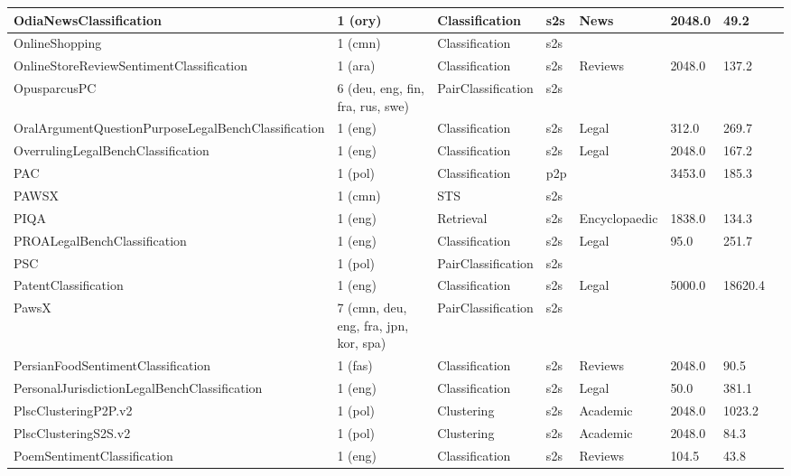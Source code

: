 \begin{longtable}{L{5.0cm}|L{1.5cm}L{1.4cm}L{1.4cm}L{1.4cm}L{1.4cm}L{1.0cm}L{1.0cm}}
 \hline 
OdiaNewsClassification \cite{kunchukuttan2020indicnlpcorpus} & 1 (ory) & Classification & s2s & News & 2048.0 & 49.2 \\
 \hline 
OnlineShopping \cite{nielsen-2023-scandeval} & 1 (cmn) & Classification & s2s &  &  &  \\
 \hline 
OnlineStoreReviewSentimentClassification  & 1 (ara) & Classification & s2s & Reviews & 2048.0 & 137.2 \\
 \hline 
OpusparcusPC \cite{creutz2018open} & 6 (deu, eng, fin, fra, rus, swe) & PairClassification & s2s &  &  &  \\
 \hline 
OralArgumentQuestionPurposeLegalBenchClassification \cite{guha2023legalbench} & 1 (eng) & Classification & s2s & Legal & 312.0 & 269.7 \\
 \hline 
OverrulingLegalBenchClassification \cite{guha2023legalbench} & 1 (eng) & Classification & s2s & Legal & 2048.0 & 167.2 \\
 \hline 
PAC  & 1 (pol) & Classification & p2p &  & 3453.0 & 185.3 \\
 \hline 
PAWSX \cite{raghu-etal-2021-end} & 1 (cmn) & STS & s2s &  &  &  \\
 \hline 
PIQA \cite{xiao2024rar} & 1 (eng) & Retrieval & s2s & Encyclopaedic & 1838.0 & 134.3 \\
 \hline 
PROALegalBenchClassification \cite{guha2023legalbench} & 1 (eng) & Classification & s2s & Legal & 95.0 & 251.7 \\
 \hline 
PSC \cite{ogrodniczuk-kopec-2014-polish} & 1 (pol) & PairClassification & s2s &  &  &  \\
 \hline 
PatentClassification \cite{sharma-etal-2019-bigpatent} & 1 (eng) & Classification & s2s & Legal & 5000.0 & 18620.4 \\
 \hline 
PawsX \cite{yang2019pawsx} & 7 (cmn, deu, eng, fra, jpn, kor, spa) & PairClassification & s2s &  &  &  \\
 \hline 
PersianFoodSentimentClassification \cite{ParsBERT} & 1 (fas) & Classification & s2s & Reviews & 2048.0 & 90.5 \\
 \hline 
PersonalJurisdictionLegalBenchClassification \cite{guha2023legalbench} & 1 (eng) & Classification & s2s & Legal & 50.0 & 381.1 \\
 \hline 
PlscClusteringP2P.v2  & 1 (pol) & Clustering & s2s & Academic & 2048.0 & 1023.2 \\
 \hline 
PlscClusteringS2S.v2  & 1 (pol) & Clustering & s2s & Academic & 2048.0 & 84.3 \\
 \hline 
PoemSentimentClassification \cite{sheng2020investigating} & 1 (eng) & Classification & s2s & Reviews & 104.5 & 43.8 \\

\end{longtable}
